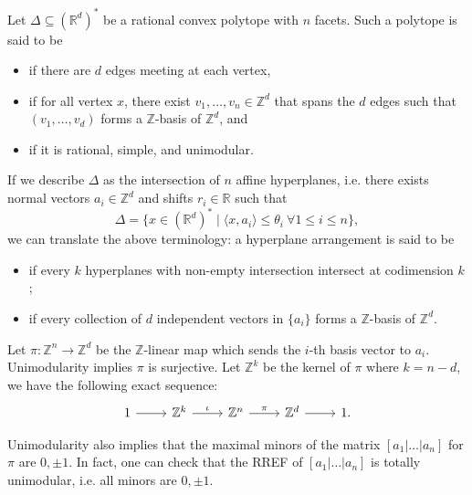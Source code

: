 \documentclass[b5paper]{article}
\begin{document}
Let $\Delta \subseteq (\mathbb{R}^d)^*$ be a rational convex polytope with $n$ facets.
Such a polytope is said to be
\begin{itemize}
    \item {} if there are $d$ edges meeting at each vertex,
    \item {} if for all vertex $x$, there exist $v_1, \dots, v_n \in \mathbb{Z}^d$ that spans the $d$ edges such that $(v_1, \dots, v_d)$ forms a $\mathbb{Z}$-basis of $\mathbb{Z}^d$, and
    \item {} if it is rational, simple, and unimodular.
\end{itemize}
If we describe $\Delta$ as the intersection of $n$ affine hyperplanes, i.e. there exists normal vectors $a_i\in \mathbb{Z}^d$ and shifts $r_i\in\mathbb{R}$ such that 
\begin{equation*}
    \Delta = \{ x \in (\mathbb{R}^d)^* \mid \langle x, a_i \rangle \leq \theta_i \  \forall 1 \leq i \leq n \},
\end{equation*}
we can translate the above terminology: a hyperplane arrangement is said to be
\begin{itemize}
    \item {} if every $k$ hyperplanes with non-empty intersection intersect at codimension $k$;
    \item {} if every collection of $d$ independent vectors in $\{a_i\}$ forms a $\mathbb{Z}$-basis of $\mathbb{Z}^d$.
\end{itemize}
Let $\pi:\mathbb{Z}^n\rightarrow \mathbb{Z}^d$ be the $\mathbb{Z}$-linear map which sends the $i$-th basis vector to $a_i$. Unimodularity implies $\pi$ is surjective. Let $\mathbb{Z}^k$ be the kernel of $\pi$ where $k=n-d$, we have the following exact sequence:
\begin{equation}
  \label{eq:exact_seq_Z}
  \begin{tikzcd}[row sep=small]
    1 \arrow[r] & \mathbb{Z}^k \arrow[r, "\iota"] & \mathbb{Z}^n \arrow[r, "\pi"] & \mathbb{Z}^d \arrow[r] & 1.
  \end{tikzcd}
\end{equation}

Unimodularity also implies that the maximal minors of the matrix $\left[a_1|\dots|a_n\right]$ for $\pi$ are $0,\pm1$. In fact, one can check that the RREF of $\left[a_1|\dots|a_n\right]$ is totally unimodular, i.e. all minors are $0,\pm1$.
\end{document}
